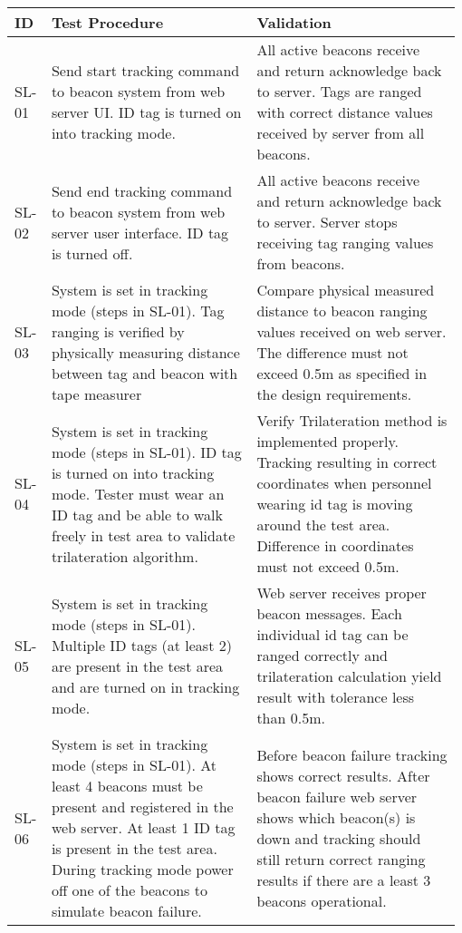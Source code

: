 \bgroup
\def\arraystretch{1.2}
\begin{table}[h!]
    \centering
    \begin{tabular}{|p{0.075\linewidth}|p{0.45\linewidth}|p{0.45\linewidth}|} 
    \hline
    ID & Test Procedure & Validation \\ 
    
    \hline
    SL-01
    & Send start tracking command to beacon system from web server UI. ID tag is turned on into tracking mode.  
    & All active beacons receive and return acknowledge  back to server. Tags are ranged with correct distance values received by server from all beacons. \\ 
    \hline    

    \hline
    SL-02
    & Send end tracking command to beacon system from web server user interface. ID tag is turned off.
    & All active beacons receive and return acknowledge back to server. Server stops receiving tag ranging values from beacons.   \\ 
    \hline   
    
    \hline
    SL-03
    & System is set in tracking mode (steps in SL-01). Tag ranging is verified by physically measuring distance between tag and beacon with tape measurer 
    & Compare physical measured distance to beacon ranging values received on web server. The difference must not exceed 0.5m as specified in the design requirements.  \\ 
    \hline   
    
    \hline
    SL-04
    & System is set in tracking mode (steps in SL-01). ID tag is turned on into tracking mode. Tester must wear an ID tag and be able to walk freely in test area to validate trilateration algorithm. 
    & Verify Trilateration method is implemented properly. Tracking resulting in correct coordinates when personnel wearing id tag is moving around the test area. Difference in coordinates must not exceed 0.5m. \\ 
    \hline
    
    \hline
    SL-05
    & System is set in tracking mode (steps in SL-01). Multiple ID tags (at least 2) are present in the test area and are turned on in tracking mode. 
    & Web server receives proper beacon messages. Each individual id tag can be ranged correctly and trilateration calculation yield result with tolerance less than 0.5m.  \\ 
    \hline
    
    \hline
    SL-06
    & System is set in tracking mode (steps in SL-01). At least 4 beacons must be present and registered in the web server. At least 1 ID tag is present in the test area. During tracking mode power off one of the beacons to simulate beacon failure. 
    & Before beacon failure tracking shows correct results. After beacon failure web server shows which beacon(s) is down and tracking should still return correct ranging results if there are a least 3 beacons operational.  \\ 
    

\end{tabular}
\end{table}
